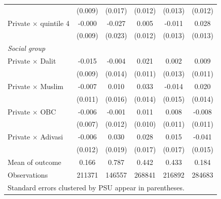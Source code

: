 {\begin{tabular}{l*{5}{c}}
            &     (0.009)         &     (0.017)         &     (0.012)         &     (0.013)         &     (0.012)         \\
\addlinespace
Private $\times$ quintile 4&      -0.000         &      -0.027         &       0.005         &      -0.011         &       0.028\sym{**} \\
            &     (0.009)         &     (0.023)         &     (0.012)         &     (0.013)         &     (0.013)         \\
\addlinespace
\textit{Social group}&                     &                     &                     &                     &                     \\
\addlinespace
Private $\times$ Dalit&      -0.015\sym{*}  &      -0.004         &       0.021\sym{*}  &       0.002         &       0.009         \\
            &     (0.009)         &     (0.014)         &     (0.011)         &     (0.013)         &     (0.011)         \\
\addlinespace
Private $\times$ Muslim&      -0.007         &       0.010         &       0.033\sym{**} &      -0.014         &       0.020         \\
            &     (0.011)         &     (0.016)         &     (0.014)         &     (0.015)         &     (0.014)         \\
\addlinespace
Private $\times$ OBC&      -0.006         &      -0.001         &       0.011         &       0.008         &      -0.008         \\
            &     (0.007)         &     (0.012)         &     (0.010)         &     (0.011)         &     (0.011)         \\
\addlinespace
Private $\times$ Adivasi&      -0.006         &       0.030         &       0.028\sym{*}  &       0.015         &      -0.041\sym{***}\\
            &     (0.012)         &     (0.019)         &     (0.017)         &     (0.017)         &     (0.015)         \\
\midrule
Mean of outcome&       0.166         &       0.787         &       0.442         &       0.433         &       0.184         \\
Observations&      211371         &      146557         &      268841         &      216892         &      284683         \\
\bottomrule
\multicolumn{6}{l}{\footnotesize Standard errors clustered by PSU appear in parentheses.}\\

\end{tabular}}
